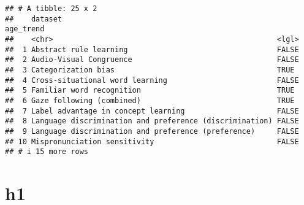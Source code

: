 \documentclass[
]{article}
\begin{document}
\begin{verbatim}
## # A tibble: 25 x 2
##    dataset                                                 age_trend
##    <chr>                                                   <lgl>    
##  1 Abstract rule learning                                  FALSE    
##  2 Audio-Visual Congruence                                 FALSE    
##  3 Categorization bias                                     TRUE     
##  4 Cross-situational word learning                         FALSE    
##  5 Familiar word recognition                               TRUE     
##  6 Gaze following (combined)                               TRUE     
##  7 Label advantage in concept learning                     FALSE    
##  8 Language discrimination and preference (discrimination) FALSE    
##  9 Language discrimination and preference (preference)     FALSE    
## 10 Mispronunciation sensitivity                            FALSE    
## # i 15 more rows
\end{verbatim}

\hypertarget{h1}{%
\section{h1}\label{h1}}
\end{document}
